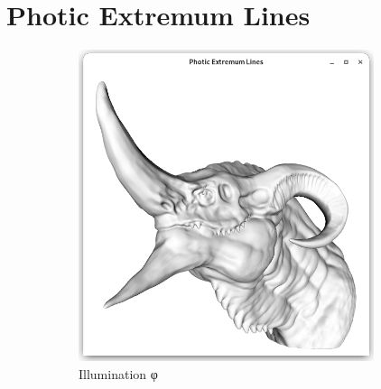 \documentclass[9pt,fleqn,twoside,twocolumn]{stdglobal}
\begin{document}

\section{Photic Extremum Lines}

  \begin{figure}[h]
    \centering
    \begin{subfigure}[b]{0.24\textwidth}
      \centering
      \includegraphics[width=0.95\textwidth,trim={15px 15 15 50},clip]{images/dragon-head-vertex-lighting.png}
      \caption{Illumination φ}
    \end{subfigure}%
    \hfill%
    \begin{subfigure}[b]{0.24\textwidth}
      \centering

\end{subfigure}
\end{figure}
\end{document}
